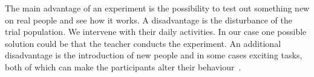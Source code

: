 \bigskip\noindent
The main advantage of an experiment is the possibility  to test out something new on real people and see how it works.
A disadvantage is the disturbance of the trial population. We intervene with their daily activities. In our case one possible solution could be that the teacher conducts the experiment. 
An additional disadvantage is the introduction of new people and in some cases exciting tasks, both of which can make the participants alter their behaviour~\cite{fernandes2006using, miller2008robots}.
